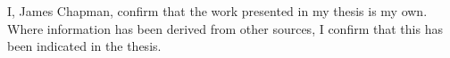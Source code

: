 I, James Chapman, confirm that the work presented in my thesis is my own.
Where information has been derived from other sources, I confirm that this has been indicated in the thesis.